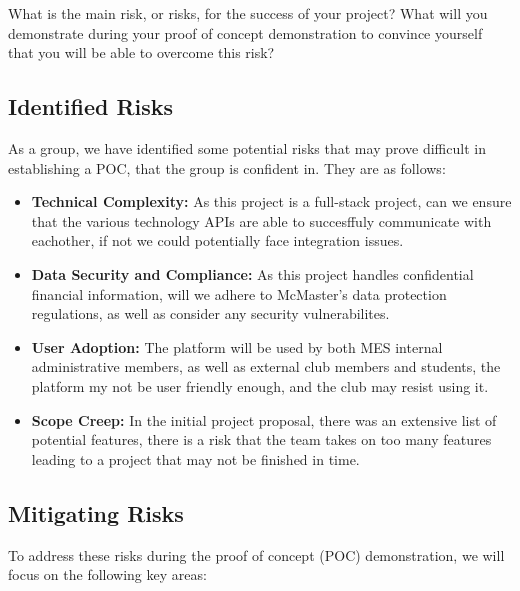 \documentclass{article}
\begin{document}
What is the main risk, or risks, for the success of your project?  What will you
demonstrate during your proof of concept demonstration to convince yourself that
you will be able to overcome this risk?

\subsection*{Identified Risks}

As a group, we have identified some potential risks that may prove difficult in establishing a POC, that the group is confident in. They are as follows:
\begin{itemize}
    \item \textbf{Technical Complexity:} As this project is a full-stack project, can we ensure that the various technology APIs are able to succesffuly communicate with eachother, if not we could potentially face integration issues.
    \item \textbf{Data Security and Compliance:} As this project handles confidential financial information, will we adhere to McMaster's data protection regulations, as well as consider any security vulnerabilites. 
    \item \textbf{User Adoption:} The platform will be used by both MES internal administrative members, as well as external club members and students, the platform my not be user friendly enough, and the club may resist using it.
    \item \textbf{Scope Creep:} In the initial project proposal, there was an extensive list of potential features, there is a risk that the team takes on too many features leading to a project that may not be finished in time. 
\end{itemize}

\subsection*{Mitigating Risks}
To address these risks during the proof of concept (POC) demonstration, we will focus on the following key areas:
\end{document}
